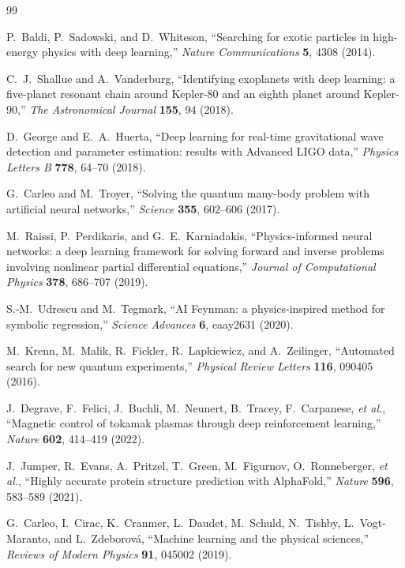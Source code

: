 \documentclass[11pt]{article}
\begin{document}

\begin{thebibliography}{99}

P.~Baldi, P.~Sadowski, and D.~Whiteson, ``Searching for exotic particles in high-energy physics with deep learning,'' \emph{Nature Communications} \textbf{5}, 4308 (2014).

C.~J.~Shallue and A.~Vanderburg, ``Identifying exoplanets with deep learning: a five-planet resonant chain around Kepler-80 and an eighth planet around Kepler-90,'' \emph{The Astronomical Journal} \textbf{155}, 94 (2018).

D.~George and E.~A.~Huerta, ``Deep learning for real-time gravitational wave detection and parameter estimation: results with Advanced LIGO data,'' \emph{Physics Letters B} \textbf{778}, 64--70 (2018).

G.~Carleo and M.~Troyer, ``Solving the quantum many-body problem with artificial neural networks,'' \emph{Science} \textbf{355}, 602--606 (2017).

M.~Raissi, P.~Perdikaris, and G.~E.~Karniadakis, ``Physics-informed neural networks: a deep learning framework for solving forward and inverse problems involving nonlinear partial differential equations,'' \emph{Journal of Computational Physics} \textbf{378}, 686--707 (2019).

S.-M.~Udrescu and M.~Tegmark, ``AI Feynman: a physics-inspired method for symbolic regression,'' \emph{Science Advances} \textbf{6}, eaay2631 (2020).

M.~Krenn, M.~Malik, R.~Fickler, R.~Lapkiewicz, and A.~Zeilinger, ``Automated search for new quantum experiments,'' \emph{Physical Review Letters} \textbf{116}, 090405 (2016).

J.~Degrave, F.~Felici, J.~Buchli, M.~Neunert, B.~Tracey, F.~Carpanese, \emph{et al.}, ``Magnetic control of tokamak plasmas through deep reinforcement learning,'' \emph{Nature} \textbf{602}, 414--419 (2022).

J.~Jumper, R.~Evans, A.~Pritzel, T.~Green, M.~Figurnov, O.~Ronneberger, \emph{et al.}, ``Highly accurate protein structure prediction with AlphaFold,'' \emph{Nature} \textbf{596}, 583--589 (2021).

G.~Carleo, I.~Cirac, K.~Cranmer, L.~Daudet, M.~Schuld, N.~Tishby, L.~Vogt-Maranto, and L.~Zdeborov\'a, ``Machine learning and the physical sciences,'' \emph{Reviews of Modern Physics} \textbf{91}, 045002 (2019).

\end{thebibliography}
\end{document}
